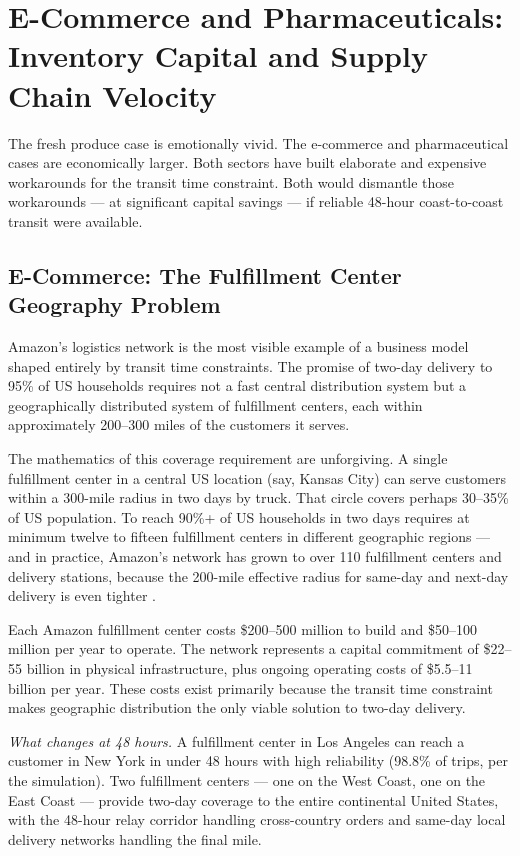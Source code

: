 \section{E-Commerce and Pharmaceuticals: Inventory Capital and Supply Chain Velocity}
\label{sec:ecommerce}

The fresh produce case is emotionally vivid. The e-commerce and pharmaceutical cases are
economically larger. Both sectors have built elaborate and expensive workarounds for the
transit time constraint. Both would dismantle those workarounds --- at significant capital
savings --- if reliable 48-hour coast-to-coast transit were available.

\subsection{E-Commerce: The Fulfillment Center Geography Problem}

Amazon's logistics network is the most visible example of a business model shaped entirely
by transit time constraints. The promise of two-day delivery to 95\% of US households
requires not a fast central distribution system but a geographically distributed system
of fulfillment centers, each within approximately 200--300 miles of the customers it serves.

The mathematics of this coverage requirement are unforgiving. A single fulfillment center
in a central US location (say, Kansas City) can serve customers within a 300-mile radius
in two days by truck. That circle covers perhaps 30--35\% of US population. To reach
90\%+ of US households in two days requires at minimum twelve to fifteen fulfillment
centers in different geographic regions --- and in practice, Amazon's network has grown
to over 110 fulfillment centers and delivery stations, because the 200-mile effective
radius for same-day and next-day delivery is even tighter \citep{FHWA_freight2023}.

Each Amazon fulfillment center costs \$200--500 million to build and \$50--100 million
per year to operate. The network represents a capital commitment of \$22--55 billion in
physical infrastructure, plus ongoing operating costs of \$5.5--11 billion per year.
These costs exist primarily because the transit time constraint makes geographic
distribution the only viable solution to two-day delivery.

\textit{What changes at 48 hours.} A fulfillment center in Los Angeles can reach a customer
in New York in under 48 hours with high reliability (98.8\% of trips, per the simulation).
Two fulfillment centers --- one on the West Coast, one on the East Coast --- provide
two-day coverage to the entire continental United States, with the 48-hour relay corridor
handling cross-country orders and same-day local delivery networks handling the final mile.

